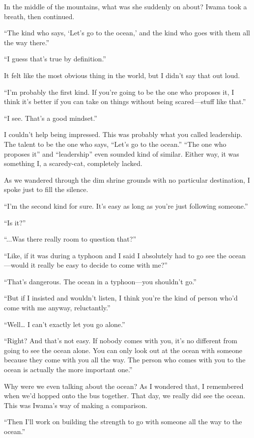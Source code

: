 \documentclass[
    a4paper,
    12pt,
    twoside,
    openany,
    UTF8,
    fontset=windows
]{ctexbook}
\begin{document}
In the middle of the mountains, what was she suddenly on about? Iwama took a breath, then continued.

“The kind who says, ‘Let’s go to the ocean,’ and the kind who goes with them all the way there.”

“I guess that’s true by definition.”

It felt like the most obvious thing in the world, but I didn’t say that out loud.

“I’m probably the first kind. If you’re going to be the one who proposes it, I think it’s better if you can take on things without being scared—stuff like that.”

“I see. That’s a good mindset.”

I couldn’t help being impressed. This was probably what you called leadership. The talent to be the one who says, “Let’s go to the ocean.” “The one who proposes it” and “leadership” even sounded kind of similar. Either way, it was something I, a scaredy-cat, completely lacked.

As we wandered through the dim shrine grounds with no particular destination, I spoke just to fill the silence.

“I’m the second kind for sure. It’s easy as long as you’re just following someone.”

“Is it?”

“...Was there really room to question that?”

“Like, if it was during a typhoon and I said I absolutely had to go see the ocean—would it really be easy to decide to come with me?”

“That’s dangerous. The ocean in a typhoon—you shouldn’t go.”

“But if I insisted and wouldn’t listen, I think you’re the kind of person who’d come with me anyway, reluctantly.”

“Well… I can’t exactly let you go alone.”

“Right? And that’s not easy. If nobody comes with you, it’s no different from going to see the ocean alone. You can only look out at the ocean with someone because they come with you all the way. The person who comes with you to the ocean is actually the more important one.”

Why were we even talking about the ocean? As I wondered that, I remembered when we’d hopped onto the bus together. That day, we really did see the ocean. This was Iwama’s way of making a comparison.

“Then I’ll work on building the strength to go with someone all the way to the ocean.”
\end{document}

